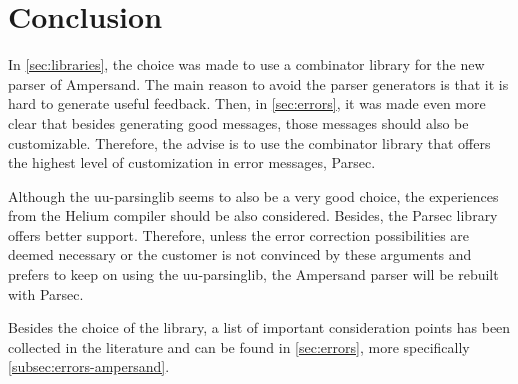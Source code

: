 
\section{Conclusion}
\label{sec:conclusion}
In \autoref{sec:libraries}, the choice was made to use a combinator library for the new parser of Ampersand.
The main reason to avoid the parser generators is that it is hard to generate useful feedback.
Then, in \autoref{sec:errors}, it was made even more clear that besides generating good messages, those messages should also be customizable.
Therefore, the advise is to use the combinator library that offers the highest level of customization in error messages, Parsec.

Although the uu-parsinglib seems to also be a very good choice, the experiences from the Helium compiler  should be also considered.
Besides, the Parsec library offers better support.
Therefore, unless the error correction possibilities are deemed necessary or the customer is not convinced by these arguments and prefers to keep on using the uu-parsinglib, the Ampersand parser will be rebuilt with Parsec.

Besides the choice of the library, a list of important consideration points has been collected in the literature and can be found in \autoref{sec:errors}, more specifically \ref{subsec:errors-ampersand}.